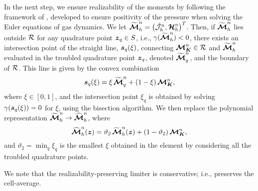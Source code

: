 In the next step, we ensure realizability of the moments by following the framework of \cite{zhangShu_2010b}, developed to ensure positivity of the pressure when solving the Euler equations of gas dynamics.  
We let $\widetilde{\boldsymbol{\mathcal{M}}}_{h}^{n}=\big(\tilde{\mathcal{J}}_{h}^{n},\boldsymbol{\mathcal{H}}_{h}^{n}\big)^{T}$.  
Then, if $\widetilde{\boldsymbol{\mathcal{M}}}_{h}^{n}$ lies outside $\mathcal{R}$ for any quadrature point $\boldsymbol{z}_{q}\in S$, i.e., $\gamma(\widetilde{\boldsymbol{\mathcal{M}}}_{h}^{n})<0$, there exists an intersection point of the straight line, $\boldsymbol{s}_{q}(\xi)$, connecting $\boldsymbol{\mathcal{M}}_{\boldsymbol{K}}^{n}\in\mathcal{R}$ and $\widetilde{\boldsymbol{\mathcal{M}}}_{h}^{n}$ evaluated in the troubled quadrature point $\boldsymbol{z}_{q}$, denoted $\widetilde{\boldsymbol{\mathcal{M}}}_{q}^{n}$, and the boundary of $\mathcal{R}$.  
This line is given by the convex combination 
\begin{equation}
  \boldsymbol{s}_{q}(\xi)=\xi\,\widetilde{\boldsymbol{\mathcal{M}}}_{q}^{n}+(1-\xi)\,\boldsymbol{\mathcal{M}}_{\boldsymbol{K}}^{n},
\end{equation}
where $\xi\in[0,1]$, and the intersection point $\xi_{q}$ is obtained by solving $\gamma(\boldsymbol{s}_{q}(\xi))=0$ for $\xi$, using the bisection algorithm.  
We then replace the polynomial representation $\widetilde{\boldsymbol{\mathcal{M}}}_{h}^{n}\to\widehat{\boldsymbol{\mathcal{M}}}_{h}^{n}$, where
\begin{equation}
  \widehat{\boldsymbol{\mathcal{M}}}_{h}^{n}(\boldsymbol{z})=\vartheta_{2}\,\widetilde{\boldsymbol{\mathcal{M}}}_{h}^{n}(\boldsymbol{z})+(1-\vartheta_{2})\,\boldsymbol{\mathcal{M}}_{\boldsymbol{K}}^{n},
  \label{eq:limitMoments}
\end{equation}
and $\vartheta_{2}=\min_{q}\xi_{q}$ is the smallest $\xi$ obtained in the element by considering all the troubled quadrature points.  

We note that the realizability-preserving limiter is conservative; i.e., preserves the cell-average.  